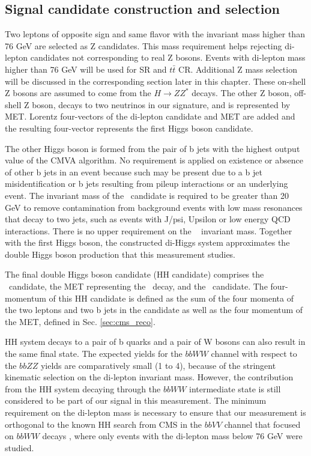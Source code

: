 \subsection{Signal candidate construction and selection}

Two leptons of opposite sign and same flavor with the invariant mass higher than 76 GeV are selected as Z candidates. This mass requirement helps rejecting di-lepton candidates not corresponding to real Z bosons. Events with di-lepton mass higher than 76 GeV will be used for SR and $t\bar{t}$ CR. Additional Z mass selection will be discussed in the corresponding section later in this chapter. These on-shell Z bosons are assumed to come from the $H \to Z Z^*$ decays. The other Z boson, off-shell Z boson, decays to two neutrinos in our signature, and is represented by MET. Lorentz four-vectors of the di-lepton candidate and MET are added and the resulting four-vector represents the first Higgs boson candidate. 

The other Higgs boson is formed from the pair of b jets with the highest output value of the CMVA algorithm. No requirement is applied on existence or absence of other b jets in an event because such may be present due to a b jet misidentification or b jets resulting from pileup interactions or an underlying event. The invariant mass of the \HBB~candidate is required to be greater than 20 GeV to remove contamination from background events with low mass resonances that decay to two jets, such as events with J/psi, Upsilon or low energy QCD interactions. There is no upper requirement on the \HBB~ invariant mass. Together with the first Higgs boson, the constructed di-Higgs system approximates the double Higgs boson production that this measurement studies. 

The final double Higgs boson candidate (HH candidate) comprises the \Zll~candidate, the MET representing the \Znn~decay, and the \HBB~candidate. The four-momentum of this HH candidate is defined as the sum of the four momenta of the two leptons and two b jets in the candidate as well as the four momentum of the MET, defined in Sec. \ref{sec:cms_reco}.

HH system decays to a pair of b quarks and a pair of W bosons can also result in the same final state. The expected yields for the $bbWW$ channel with respect to the $bbZZ$ yields are comparatively small (1 to 4), because of the stringent kinematic selection on the di-lepton invariant mass. However, the contribution from the HH system decaying through the $bbWW$ intermediate state is still considered to be part of our signal in this measurement. The minimum requirement on the di-lepton mass is necessary to ensure that our measurement is orthogonal to the known HH search from CMS in the $bbVV$ channel that focused on $bbWW$ decays \cite{bbWW}, where only events with the di-lepton mass below 76 GeV were studied.

